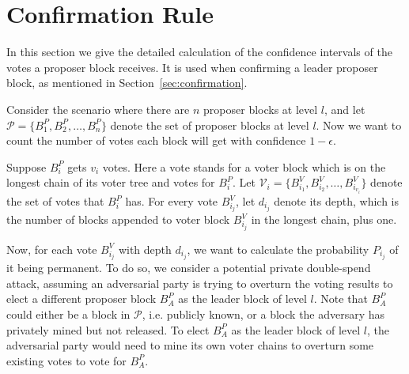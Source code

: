 \section{Confirmation Rule}
\label{apx:confirmation}

In this section we give the detailed calculation of the confidence intervals of the votes a proposer block receives. It is used when confirming a leader proposer block, as mentioned in Section~\ref{sec:confirmation}.

Consider the scenario where there are $n$ proposer blocks at level $l$, and let $\mathcal P =\{B^P_1, B^P_2, \ldots, B^P_n\}$ denote the set of proposer blocks at level $l$. Now we want to count the number of votes each block will get with confidence $1-\epsilon$.

Suppose $B^P_i$ gets $v_i$ votes. Here a vote stands for a voter block which is on the longest chain of its voter tree and votes for $B^P_i$. 
Let $\mathcal V_i =\{B^V_{i_1}, B^V_{i_2}, \ldots, B^V_{i_{v_i}}\}$ denote the set of votes that $B^P_i$ has. For every vote $B^V_{i_j}$, let $d_{i_j}$ denote its depth, which is the number of blocks appended to voter block $B^V_{i_j}$ in the longest chain, plus one.

Now, for each vote $B^V_{i_j}$ with depth $d_{i_j}$, we want to calculate the probability $P_{i_j}$ of it being permanent. 
To do so, we consider a potential private double-spend attack, assuming an adversarial party is trying to overturn the voting results to elect a different proposer block $B^P_A$ as the leader block of level $l$. 
Note that $B^P_A$ could either be a block in $\mathcal P$, i.e. publicly known, or a block the adversary has privately mined but not released. 
To elect $B^P_A$ as the leader block of level $l$, the adversarial party would need to mine its own voter chains to overturn some existing votes to vote for $B^P_A$. 

